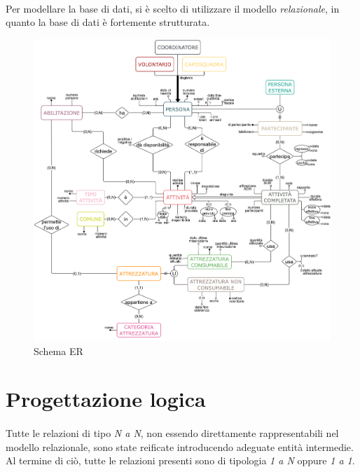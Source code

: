 \documentclass[12pt,a4paper,twoside,english,italian]{book}
\begin{document}
\paragraph{} Per modellare la base di dati, si è scelto di utilizzare il modello \emph{relazionale}, in quanto la base di dati è fortemente strutturata.

\begin{figure}[H]
    \centering
    \includegraphics[width=1\textwidth]{img/er-schema.png}
    \caption{Schema ER}
\end{figure}

\newpage

\section{Progettazione logica}

\paragraph{} Tutte le relazioni di tipo \emph{N a N}, non essendo direttamente rappresentabili nel modello relazionale, sono state reificate introducendo adeguate entità intermedie. Al termine di ciò, tutte le relazioni presenti sono di tipologia \emph{1 a N} oppure \emph{1 a 1}. 
\end{document}
